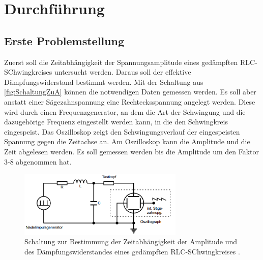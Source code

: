 \section{Durchführung}
\label{sec:Durchfuehrung}
\subsection{Erste Problemstellung}
Zuerst soll die Zeitabhängigkeit der Spannungsamplitude eines gedämpften RLC-SChwingkreises untersucht werden. Daraus soll der effektive Dämpfungswiderstand bestimmt
werden. Mit der Schaltung aus \autoref{fig:SchaltungZuA} können die notwendigen Daten gemessen werden. Es soll aber anstatt einer Sägezahnspannung eine Rechtecksspannung 
angelegt werden. Diese wird durch einen Frequenzgenerator, an dem die Art der Schwingung und die dazugehörige Frequenz eingestellt werden kann, in die den Schwingkreis 
eingespeist. Das Oszilloskop zeigt den Schwingungsverlauf der eingespeisten Spannung gegen die Zeitachse an. Am Oszilloskop kann die Amplitude und die Zeit abgelesen werden. Es soll 
gemessen werden bis die Amplitude um den Faktor 3-8 abgenommen hat. 
\begin{figure}
    \includegraphics[width=0.7\textwidth]{content/SchaltungZuA.pdf}
    \centering
    \caption{Schaltung zur Bestimmung der Zeitabhängigkeit der Amplitude und des Dämpfungswiderstandes eines gedämpften RLC-SChwingkreises \cite{v354}.}
    \label{fig:SchaltungZuA}
\end{figure}
